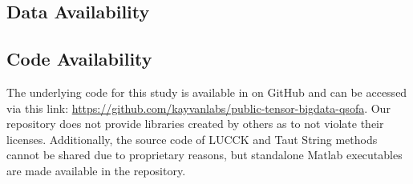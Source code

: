 \subsection*{Data Availability}


\subsection*{Code Availability}
The underlying code for this study is available in on GitHub and can be accessed via this link: \url{https://github.com/kayvanlabs/public-tensor-bigdata-qsofa}. Our repository does not provide libraries created by others as to not violate their licenses. Additionally, the source code of LUCCK and Taut String methods cannot be shared due to proprietary reasons, but standalone Matlab executables are made available in the repository.
